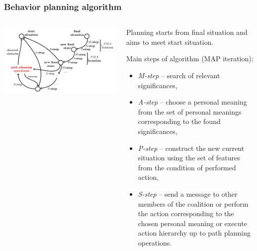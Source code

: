 \documentclass[default]{beamer}
\begin{document}
	\begin{frame}
		\frametitle{Behavior planning algorithm}
		
		\begin{columns}
			\begin{column}{0.7\textwidth}
				\includegraphics[width=\textwidth]{strl/beh_plan-0.png}
			\end{column}
			\begin{column}{0.3\textwidth}
				\tiny
				Planning starts from final situation and aims to meet start situation.
				\par\bigskip
				Main steps of algorithm (MAP iteration):
				\begin{itemize}
					\item \textit{M-step} -- search of relevant significances,
					\item \textit{A-step} -- choose a personal meaning from the set of personal meanings corresponding to the found significances,
					\item \textit{P-step} -- construct the new current situation using the set of features from the condition of performed action,
					\item \textit{S-step} -- send a message to other members of the coalition  or perform the action corresponding to the chosen personal meaning or execute action hierarchy up to \color{red} path planning operations.
				\end{itemize}
			\end{column}
		\end{columns}
		\nocite{*}
		\printbibliography[keyword={behplan}, resetnumbers=true]
	\end{frame}	
	
\end{document}
